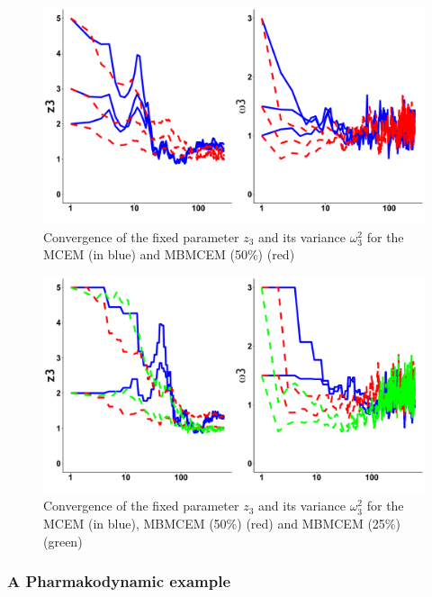 \documentclass[a4paper]{article}
\theoremstyle{plain}
\theoremstyle{plain}
\theoremstyle{definition}
\begin{document}
\begin{figure}[h]
\begin{center}
\includegraphics[scale=0.3]{pics/ordinal_imcem_final.pdf}
\caption{Convergence of the fixed parameter $z_3$ and its variance $\omega_3^2$ for the MCEM (in blue) and MBMCEM (50\%) (red)}
\label{ordinal}
\end{center}
\end{figure}

\begin{figure}[h]
\begin{center}
\includegraphics[scale=0.3]{pics/ordinal_severalbatch.pdf}
\caption{Convergence of the fixed parameter $z_3$ and its variance $\omega_3^2$ for the MCEM (in blue), MBMCEM (50\%) (red) and MBMCEM (25\%) (green)}
\label{ordinal}
\end{center}
\end{figure}

\clearpage
\subsubsection{A Pharmakodynamic example}
\end{document}
